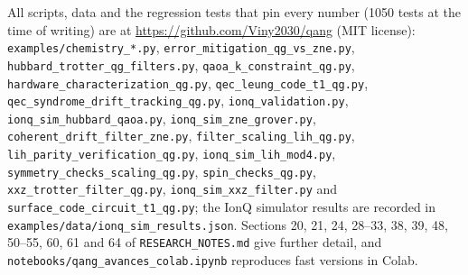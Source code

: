 \documentclass[11pt]{article}
\begin{document}
All scripts, data and the regression tests that pin every number (1050 tests at the time of writing)
are at \url{https://github.com/Viny2030/qang} (MIT license): \texttt{examples/chemistry\_*.py},
\texttt{error\_mitigation\_qg\_vs\_zne.py}, \texttt{hubbard\_trotter\_qg\_filters.py},
\texttt{qaoa\_k\_constraint\_qg.py}, \texttt{hardware\_characterization\_qg.py},
\texttt{qec\_leung\_code\_t1\_qg.py}, \texttt{qec\_syndrome\_drift\_tracking\_qg.py},
\texttt{ionq\_validation.py}, \texttt{ionq\_sim\_hubbard\_qaoa.py},
\texttt{ionq\_sim\_zne\_grover.py}, \texttt{coherent\_drift\_filter\_zne.py},
\texttt{filter\_scaling\_lih\_qg.py}, \texttt{lih\_parity\_verification\_qg.py},
\texttt{ionq\_sim\_lih\_mod4.py}, \texttt{symmetry\_checks\_scaling\_qg.py}, \texttt{spin\_checks\_qg.py}, \texttt{xxz\_trotter\_filter\_qg.py}, \texttt{ionq\_sim\_xxz\_filter.py} and \texttt{surface\_code\_circuit\_t1\_qg.py}; the IonQ simulator results are recorded in
\texttt{examples/data/ionq\_sim\_results.json}. Sections 20, 21, 24, 28--33, 38, 39, 48, 50--55, 60, 61 and 64 of
\texttt{RESEARCH\_NOTES.md} give further detail, and \texttt{notebooks/qang\_avances\_colab.ipynb}
reproduces fast versions in Colab.



\end{document}
